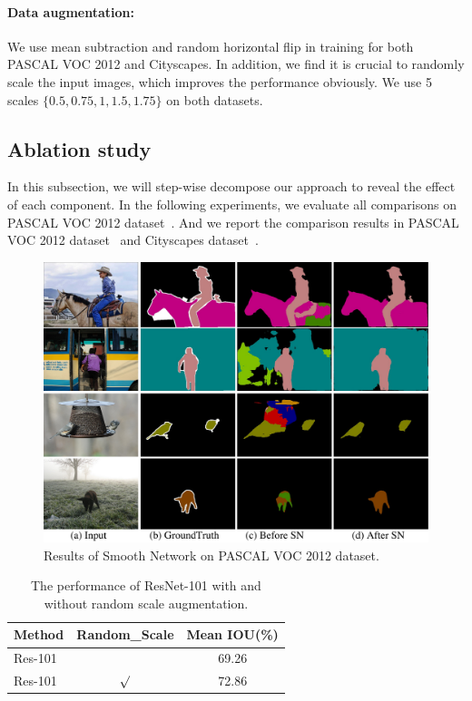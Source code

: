 \documentclass[10pt,twocolumn,letterpaper]{article}
\begin{document}
\vspace{-2ex}    
\paragraph{Data augmentation:} We use mean subtraction and random horizontal flip in training for both PASCAL VOC 2012 and Cityscapes. In addition, we find it is crucial to randomly scale the input images, which improves the performance obviously. We use 5 scales $\{0.5, 0.75, 1, 1.5, 1.75\}$ on both datasets.

\subsection{Ablation study}
In this subsection, we will step-wise decompose our approach to reveal the effect of each component. In the following experiments, we evaluate all comparisons on PASCAL VOC 2012 dataset~\cite{Pascal-VOC-2012}. And we report the comparison results in PASCAL VOC 2012 dataset~\cite{Pascal-VOC-2012} and Cityscapes dataset~\cite{Cityscapes}.

\begin{figure}[t]
\centering
\includegraphics[width=\linewidth]{res-sn.pdf}
\caption{Results of Smooth Network on PASCAL VOC 2012 dataset. }
\label{fig:result-sn}
\end{figure}

\begin{table}[t]
\begin{center}
\caption{The performance of ResNet-101 with and without random scale augmentation.}
\label{tab:baseline}
\begin{tabular}{lcc}
\toprule
Method & Random\_Scale & Mean IOU(\%)\\
\hline
 \noalign{\smallskip}
Res-101 & & 69.26 \\
Res-101 & $\surd$ & 72.86\\
\bottomrule
\end{tabular}
\end{center}
\end{table}
\end{document}
